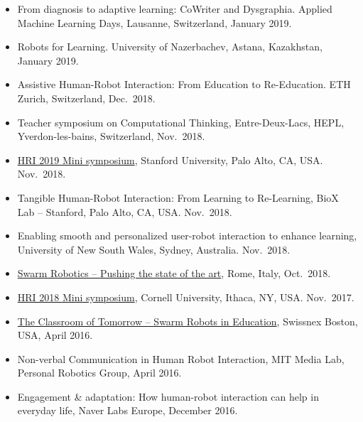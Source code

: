 \begin{itemize}
    \item From diagnosis to adaptive learning: CoWriter and Dysgraphia. Applied Machine Learning Days, Lausanne, Switzerland, January 2019.
    \item Robots for Learning. University of Nazerbachev, Astana, Kazakhstan, January 2019.
    \item Assistive Human-Robot Interaction: From Education to Re-Education. ETH Zurich, Switzerland, Dec.\ 2018.
    \item Teacher symposium on Computational Thinking, Entre-Deux-Lacs, HEPL, Yverdon-les-bains, Switzerland, Nov.\ 2018.
    \item \href{https://hri2019symposium.wordpress.com/}{HRI 2019 Mini symposium}, Stanford University, Palo Alto, CA, USA. Nov.\ 2018.
    \item Tangible Human-Robot Interaction: From Learning to Re-Learning, BioX Lab -- Stanford, Palo Alto, CA, USA. Nov.\ 2018.
    \item Enabling smooth and personalized user-robot interaction to enhance learning, University of New South Wales, Sydney, Australia. Nov.\ 2018.
    \item \href{http://laral.istc.cnr.it/swarm_robotics_2018/}{Swarm Robotics -- Pushing the state of the art}, Rome, Italy, Oct.\ 2018.
    \item \href{https://hri2018symposium.wordpress.com/}{HRI 2018 Mini symposium}, Cornell University, Ithaca, NY, USA. Nov.\ 2017.
    \item \href{https://www.swissnexboston.org/event/the-classroom-of-tomorrow-swarm-robots-in-education/}{The Classroom of Tomorrow -- Swarm Robots in Education}, Swissnex Boston, USA, April 2016.
    \item Non-verbal Communication in Human Robot Interaction, MIT Media Lab, Personal Robotics Group, April 2016.
    \item Engagement \& adaptation: How human-robot interaction can help in everyday life, Naver Labs Europe, December 2016.
\end{itemize}

